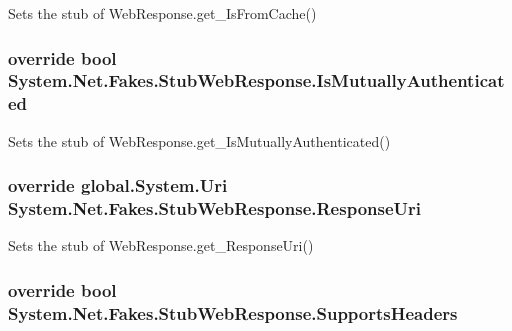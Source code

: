 Sets the stub of Web\-Response.\-get\-\_\-\-Is\-From\-Cache()

\hypertarget{class_system_1_1_net_1_1_fakes_1_1_stub_web_response_af3f5721269b78780c9728c5158e73998}{
\subsubsection[{Is\-Mutually\-Authenticated}]{\setlength{\rightskip}{0pt plus 5cm}override bool System.\-Net.\-Fakes.\-Stub\-Web\-Response.\-Is\-Mutually\-Authenticated\hspace{0.3cm}{\ttfamily [get]}}}\label{class_system_1_1_net_1_1_fakes_1_1_stub_web_response_af3f5721269b78780c9728c5158e73998}


Sets the stub of Web\-Response.\-get\-\_\-\-Is\-Mutually\-Authenticated()

\hypertarget{class_system_1_1_net_1_1_fakes_1_1_stub_web_response_ab09ab6ed150da28d38d510e53b6ec91e}{
\subsubsection[{Response\-Uri}]{\setlength{\rightskip}{0pt plus 5cm}override global.\-System.\-Uri System.\-Net.\-Fakes.\-Stub\-Web\-Response.\-Response\-Uri\hspace{0.3cm}{\ttfamily [get]}}}\label{class_system_1_1_net_1_1_fakes_1_1_stub_web_response_ab09ab6ed150da28d38d510e53b6ec91e}


Sets the stub of Web\-Response.\-get\-\_\-\-Response\-Uri()

\hypertarget{class_system_1_1_net_1_1_fakes_1_1_stub_web_response_a3d386d4bfc1c1a0c536adf84ffa4bfc9}{
\subsubsection[{Supports\-Headers}]{\setlength{\rightskip}{0pt plus 5cm}override bool System.\-Net.\-Fakes.\-Stub\-Web\-Response.\-Supports\-Headers\hspace{0.3cm}{\ttfamily [get]}}}\label{class_system_1_1_net_1_1_fakes_1_1_stub_web_response_a3d386d4bfc1c1a0c536adf84ffa4bfc9}


